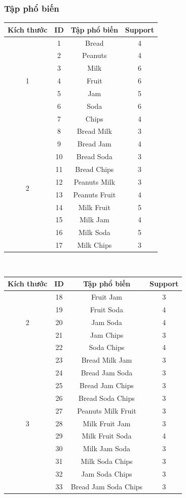 \documentclass{article}
\begin{document}
\subsubsection{Tập phổ biến}
\begin{table}[H]
\begin{tabular}[t]{|c | c | c | c|}
	\hline
	Kích thước & ID & Tập phổ biến  & Support \\ \hline
	\multirow{7}{*}{1} & 1 & Bread & 4 \\
	&2& Peanuts & 4 \\
	&3& Milk & 6 \\
	&4& Fruit & 6 \\
	&5& Jam & 5 \\
	&6& Soda & 6 \\
	&7& Chips & 4 \\ 
	\hline
	\multirow{10}{*}{2}&8& Bread Milk& 3\\
	&9& Bread Jam& 4\\
	&10& Bread Soda& 3\\
	&11& Bread Chips& 3\\
	&12& Peanuts Milk& 3\\
	&13& Peanuts Fruit& 4\\
	&14& Milk Fruit& 5\\
	&15& Milk Jam& 4\\
	&16& Milk Soda& 5\\
	&17& Milk Chips & 3\\

	\hline
\end{tabular}~%
\begin{tabular}[t]{|c | c | c | c|}
	\hline
	Kích thước & ID & Tập phổ biến  & Support \\ \hline
	\multirow{5}{*}{2}&18& Fruit Jam& 3\\
	&19&Fruit Soda& 4\\
	&20&Jam Soda& 4\\
	&21& Jam Chips& 3\\
	&22& Soda Chips& 4\\
	\hline 
	\multirow{15}{*}{3}&23&Bread Milk Jam& 3\\
	&24&Bread Jam Soda& 3\\
	&25&Bread Jam Chips& 3\\
	&26&Bread Soda Chips& 3\\
	&27&Peanuts Milk Fruit& 3\\
	&28&Milk Fruit Jam& 3\\
	&29&Milk Fruit Soda& 4\\
	&30&Milk Jam Soda& 3\\
	&31&Milk Soda Chips& 3\\
	&32&Jam Soda Chips& 3\\
	\hline
	4&33&Bread Jam Soda Chips& 3\\
	\hline
\end{tabular}
\end{table}
\end{document}
